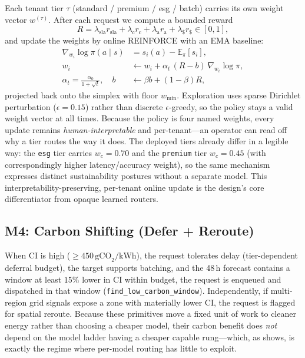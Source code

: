 \documentclass[10pt,twocolumn]{article}
\newcommand{\gcokwh}{\,\text{gCO}_2/\text{kWh}}
\begin{document}
Each tenant tier $\tau$ (standard / premium / esg / batch) carries its own
weight vector $w^{(\tau)}$. After each request we compute a bounded reward
\begin{equation}
R = \lambda_{\text{sla}} r_{\text{sla}} + \lambda_{\text{c}} r_{\text{c}}
  + \lambda_{\text{a}} r_{\text{a}} + \lambda_{\$} r_{\$} \in [0,1],
\end{equation}
and update the weights by online REINFORCE with an EMA baseline:
\begin{align}
\nabla_{w_i}\!\log \pi(a\!\mid\! s) &= s_i(a) - \mathbb{E}_\pi[s_i], \nonumber\\
w_i &\leftarrow w_i + \alpha_t\,(R - b)\,\nabla_{w_i}\!\log\pi, \\
\alpha_t = \tfrac{\alpha_0}{1+\sqrt{t}}, \quad
b &\leftarrow \beta b + (1-\beta)R , \nonumber
\end{align}
projected back onto the simplex with floor $w_{\min}$. Exploration uses sparse
Dirichlet perturbation ($\epsilon{=}0.15$) rather than discrete
$\epsilon$-greedy, so the policy stays a valid weight vector at all times.
Because the policy is four named weights, every update remains
\emph{human-interpretable} and per-tenant---an operator can read off why a tier
routes the way it does. The deployed tiers already differ in a legible way:
the \texttt{esg} tier carries $w_c{=}0.70$ and the \texttt{premium} tier
$w_c{=}0.45$ (with correspondingly higher latency/accuracy weight), so the same
mechanism expresses distinct sustainability postures without a separate model.
This interpretability-preserving, per-tenant online update is the design's core
differentiator from opaque learned routers.

\subsection{M4: Carbon Shifting (Defer + Reroute)}
\label{sec:m4}

When CI is high ($\ge 450\gcokwh$), the request tolerates delay
(tier-dependent deferral budget), the target supports batching, and the 48\,h
forecast contains a window at least $15\%$ lower in CI within budget, the
request is enqueued and dispatched in that window
(\texttt{find\_low\_carbon\_window}). Independently, if multi-region grid
signals expose a zone with materially lower CI, the request is flagged for
spatial reroute. Because these primitives move a fixed unit of work to cleaner
energy rather than choosing a cheaper model, their carbon benefit does
\emph{not} depend on the model ladder having a cheaper capable rung---which,
as  shows, is exactly the regime where per-model routing has
little to exploit.
\end{document}
